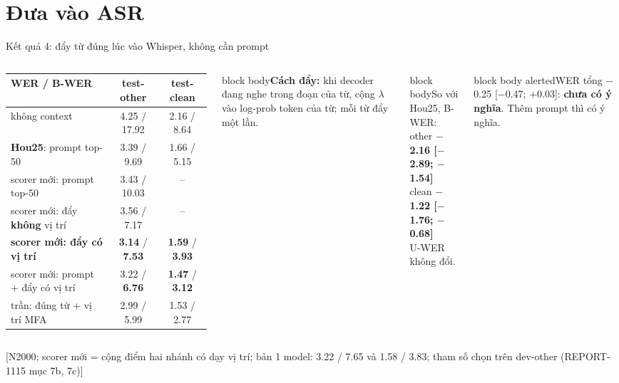 \documentclass[aspectratio=169,xcolor=table]{beamer}
\newcommand{\bad}[1]{\textcolor{RiskRed}{\textbf{#1}}}
\newcommand{\good}[1]{\textcolor{GoodGreen}{\textbf{#1}}}
\newcommand{\src}[1]{{\tiny\color{TextGray}[#1]}}
\newcommand{\nbox}[2][block body]{\begin{beamercolorbox}[sep=0.45em,rounded=true]{#1}\footnotesize #2\end{beamercolorbox}}
\begin{document}
\section{Đưa vào ASR}
\begin{frame}{Kết quả 4: đẩy từ đúng lúc vào Whisper, không cần prompt}
\begin{columns}[T]
\renewcommand{\arraystretch}{1.12}\footnotesize
\begin{tabular}{L{4.0cm}cc}
\toprule
WER / B-WER & test-other & test-clean \\
\midrule
không context & 4.25 / 17.92 & 2.16 / 8.64 \\
\textbf{Hou25}: prompt top-50 & 3.39 / 9.69 & 1.66 / 5.15 \\
scorer mới: prompt top-50 & 3.43 / 10.03 & -- \\
scorer mới: đẩy \textbf{không} vị trí & 3.56 / 7.17 & -- \\
\textbf{scorer mới: đẩy có vị trí} & \textbf{3.14} / \textbf{7.53} & \textbf{1.59} / \textbf{3.93} \\
scorer mới: prompt + đẩy có vị trí & 3.22 / \textbf{6.76} & \textbf{1.47} / \textbf{3.12} \\
\midrule
trần: đúng từ + vị trí MFA & 2.99 / 5.99 & 1.53 / 2.77 \\
\bottomrule
\end{tabular}
\nbox{\textbf{Cách đẩy:} khi decoder đang nghe trong đoạn của từ, cộng $\lambda$ vào log-prob token của từ; mỗi từ đẩy một lần.}
\vspace{0.1cm}
\nbox{So với Hou25, B-WER:\\
other \good{$-$2.16 [$-$2.89; $-$1.54]}\\
clean \good{$-$1.22 [$-$1.76; $-$0.68]}\\
U-WER không đổi.}
\vspace{0.1cm}
\nbox[block body alerted]{WER tổng $-$0.25 [$-$0.47; +0.03]: \bad{chưa có ý nghĩa}. Thêm prompt thì có ý nghĩa.}
\end{columns}
\src{N2000; scorer mới = cộng điểm hai nhánh có dạy vị trí; bản 1 model: 3.22 / 7.65 và 1.58 / 3.83; tham số chọn trên dev-other (REPORT-1115 mục 7b, 7c)}
\end{frame}
\end{document}
